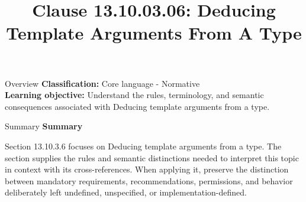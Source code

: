 \documentclass[10pt,letterpaper]{article}
\title{Clause 13.10.03.06: Deducing Template Arguments From A Type}
\author{}
\date{}
\begin{document}
\maketitle
\begin{CornellOverviewBox}{Overview}
\textbf{Classification:} Core language - Normative\\[2pt]
\textbf{Learning objective:} Understand the rules, terminology, and semantic consequences associated with Deducing template arguments from a type.
\end{CornellOverviewBox}\begin{CornellSummaryBox}{Summary}
{\sffamily\bfseries\color{Accent} Summary}\par\vspace{3pt}Section 13.10.3.6 focuses on Deducing template arguments from a type. The section supplies the rules and semantic distinctions needed to interpret this topic in context with its cross-references. When applying it, preserve the distinction between mandatory requirements, recommendations, permissions, and behavior deliberately left undefined, unspecified, or implementation-defined.
\end{CornellSummaryBox}
\end{document}
